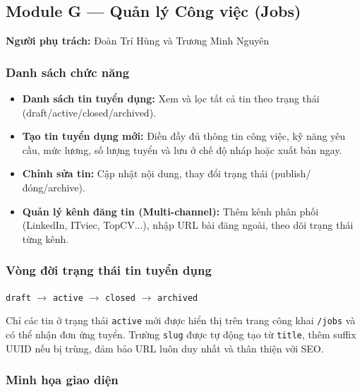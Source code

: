 \subsection{Module G --- Quản lý Công việc (Jobs)}
\textbf{Người phụ trách:} Đoàn Trí Hùng và Trương Minh Nguyên

\subsubsection*{Danh sách chức năng}
\begin{itemize}
    \item \textbf{Danh sách tin tuyển dụng:} Xem và lọc tất cả tin theo trạng thái (draft/active/closed/archived).
    \item \textbf{Tạo tin tuyển dụng mới:} Điền đầy đủ thông tin công việc, kỹ năng yêu cầu, mức lương, số lượng tuyển và lưu ở chế độ nháp hoặc xuất bản ngay.
    \item \textbf{Chỉnh sửa tin:} Cập nhật nội dung, thay đổi trạng thái (publish/đóng/archive).
    \item \textbf{Quản lý kênh đăng tin (Multi-channel):} Thêm kênh phân phối (LinkedIn, ITviec, TopCV...), nhập URL bài đăng ngoài, theo dõi trạng thái từng kênh.
\end{itemize}

\subsubsection*{Vòng đời trạng thái tin tuyển dụng}
\begin{center}
    \texttt{draft} $\to$ \texttt{active} $\to$ \texttt{closed} $\to$ \texttt{archived}
\end{center}

Chỉ các tin ở trạng thái \texttt{active} mới được hiển thị trên trang công khai \texttt{/jobs} và có thể nhận đơn ứng tuyển. Trường \texttt{slug} được tự động tạo từ \texttt{title}, thêm suffix UUID nếu bị trùng, đảm bảo URL luôn duy nhất và thân thiện với SEO.

\subsubsection*{Minh họa giao diện}
